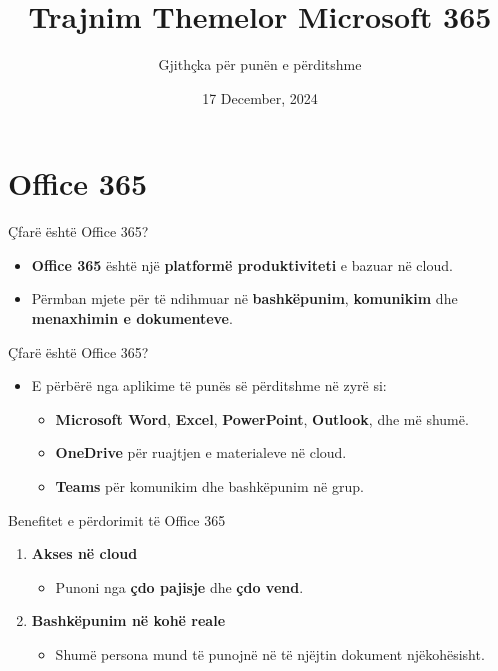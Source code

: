 \documentclass[
  ignorenonframetext,
]{beamer}
\title{Trajnim Themelor Microsoft 365}
\subtitle{Gjithçka për punën e përditshme}
\author{}
\date{\vspace{-2.5em}17 December, 2024}
\providecommand{\tightlist}{%
  \setlength{\itemsep}{0pt}\setlength{\parskip}{0pt}}
\begin{document}
\frame{\titlepage}

\begin{frame}[allowframebreaks]
  \tableofcontents[hideallsubsections]
\end{frame}
\section{Office 365}\label{office-365}

\begin{frame}{Çfarë është Office 365?}
\label{uxe7faruxeb-uxebshtuxeb-office-365}
\begin{itemize}
\item
  \textbf{Office 365} është një \textbf{platformë produktiviteti} e
  bazuar në cloud.
\item
  Përmban mjete për të ndihmuar në \textbf{bashkëpunim},
  \textbf{komunikim} dhe \textbf{menaxhimin e dokumenteve}.
\end{itemize}
\end{frame}

\begin{frame}{Çfarë është Office 365?}
\label{uxe7faruxeb-uxebshtuxeb-office-365-1}
\begin{itemize}
\item
  E përbërë nga aplikime të punës së përditshme në zyrë si:

  \begin{itemize}
  \item
    \textbf{Microsoft Word}, \textbf{Excel}, \textbf{PowerPoint},
    \textbf{Outlook}, dhe më shumë.
  \item
    \textbf{OneDrive} për ruajtjen e materialeve në cloud.
  \item
    \textbf{Teams} për komunikim dhe bashkëpunim në grup.
  \end{itemize}
\end{itemize}
\end{frame}

\begin{frame}{Benefitet e përdorimit të Office 365}
\label{benefitet-e-puxebrdorimit-tuxeb-office-365}
\begin{enumerate}
\item
  \textbf{Akses në cloud}

  \begin{itemize}
  \tightlist
  \item
    Punoni nga \textbf{çdo pajisje} dhe \textbf{çdo vend}.
  \end{itemize}
\item
  \textbf{Bashkëpunim në kohë reale}

  \begin{itemize}
  \tightlist
  \item
    Shumë persona mund të punojnë në të njëjtin dokument njëkohësisht.
  \end{itemize}
\end{enumerate}
\end{frame}
\end{document}
